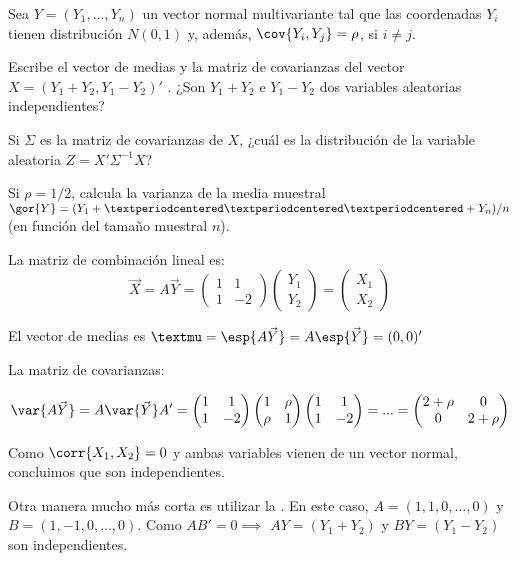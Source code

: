 \begin{problem}[8]
Sea $Y = (Y_1,...,Y_n)$ un vector normal multivariante tal que las coordenadas $Y_i$ tienen distribución
$N(0, 1)$ y, además, $\cov{Y_i , Y_j} = \rho$, si $i≠j$.

\ppart Escribe el vector de medias y la matriz de covarianzas del vector $X = (Y_1+Y_2,Y_1−Y_2)'$ . ¿Son $Y_1+Y_2 $ e $Y_1−Y_2$ dos variables aleatorias independientes?

\ppart Si $Σ$ es la matriz de covarianzas de $X$, ¿cuál es la distribución de la variable aleatoria $Z = X'Σ^{−1}X$?

\ppart Si $ρ = 1/2$, calcula la varianza de la media muestral $\gor{Y}= (Y_1 + · · · + Y_n )/n$ (en función del tamaño muestral $n$).

\solution
{}

\spart 
La matriz de combinación lineal es:
\[\vec{X} = A\vec{Y} = \begin{pmatrix}1&1\\1&-2\end{pmatrix}\begin{pmatrix}Y_1\\Y_2\end{pmatrix} = \begin{pmatrix}X_1\\X_2\end{pmatrix}\]

El vector de medias es $µ = \esp{A\vec{Y}} = A\esp{\vec{Y}} = (0,0)'$

La matriz de covarianzas:

\[
\var{A\vec{Y}} = A\var{\vec{Y}}A' = \begin{pmatrix}1&1\\1&-2\end{pmatrix}\begin{pmatrix}1&\rho\\\rho&1\end{pmatrix}\begin{pmatrix}1&1\\1&-2\end{pmatrix} = ... = \begin{pmatrix}2+\rho&0\\0&2+\rho \end{pmatrix}
\]

Como $\corr{X_1,X_2} = 0$ y ambas variables vienen de un vector normal, concluimos que son independientes.


Otra manera mucho más corta es utilizar la . En este caso, $A = (1,1,0,...,0)$ y $B = (1,-1,0,...,0)$. Como $AB' = 0\implies $ $AY=(Y_1+Y_2)$ y $BY = (Y_1-Y_2)$ son independientes. 


\end{problem}
